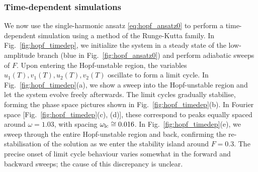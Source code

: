 \subsubsection{Time-dependent simulations}

We now use the single-harmonic ansatz \eqref{eq:hopf_ansatz0} to perform a time-dependent simulation using a method of the Runge-Kutta family. In Fig.~\ref{fig:hopf_timedep}, we initialize the system in a steady state of the low-amplitude branch (blue in Fig.~\ref{fig:hopf_ansatz0}) and perform adiabatic sweeps of $F$. Upon entering the Hopf-unstable region, the variables $u_1(T), v_1(T), u_2(T), v_2(T)$ oscillate to form a limit cycle. In Fig.~\ref{fig:hopf_timedep}(a), we show a sweep into the Hopf-unstable region and let the system evolve freely afterwards. The limit cycles gradually stabilise, forming the phase space pictures shown in Fig.~\ref{fig:hopf_timedep}(b). In Fourier space [Fig.~\ref{fig:hopf_timedep}(c), (d)], these correspond to peaks equally spaced around $\omega=1.03$, with spacing $\omega_{\rm lc} \cong 0.016$. In Fig.~\ref{fig:hopf_timedep}(e), we sweep through the entire Hopf-unstable region and back, confirming the re-stabilisation of the solution as we enter the stability island around $F = 0.3$. The precise onset of limit cycle behaviour varies somewhat in the forward and backward sweeps; the cause of this discrepancy is unclear. 
